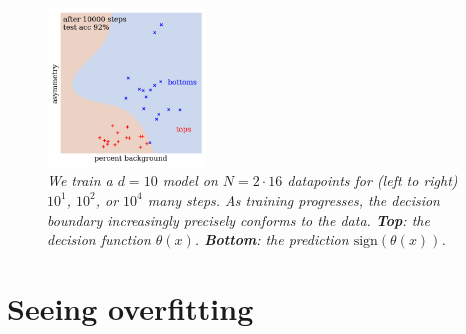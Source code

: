 \documentclass[openany, notitlepage, justified]{tufte-book}
\begin{document}
\begin{figure}[h]
                \includegraphics[height=4.2cm]{yo-10-0016-hard-10000}
                \caption{\emph{
                    We train a $d=10$ model on $N=2\cdot 16$ datapoints for
                    (left to right) $10^1$, $10^2$, or $10^4$ many
                    steps.  As training progresses, the decision boundary
                    increasingly precisely conforms to the data.
                    \textbf{Top}:    the decision function $\theta(x)$.
                    \textbf{Bottom}: the prediction $\text{sign}(\theta(x))$. 
                }}
            \end{figure}

            \newpage
        \section{Seeing overfitting}
\end{document}
